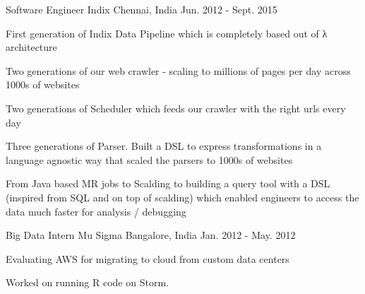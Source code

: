 \begin{cventries}
  \cventry
    {Software Engineer} %
    {Indix} %
    {Chennai, India} %
    {Jun. 2012 - Sept. 2015} %
    {
      \begin{cvitems} %
        \item {First generation of Indix Data Pipeline which is completely based out of λ architecture }
        \item {Two generations of our web crawler - scaling to millions of pages per day across 1000s of websites }
        \item {Two generations of Scheduler which feeds our crawler with the right urls every day }
        \item {Three generations of Parser. Built a DSL to express transformations in a language agnostic way that scaled the parsers to 1000s of websites }
        \item {From Java based MR jobs to Scalding to building a query tool with a DSL (inspired from SQL and on top of scalding) which enabled engineers to access the data much faster for analysis / debugging }
      \end{cvitems}
    }

  \cventry
    {Big Data Intern} %
    {Mu Sigma} %
    {Bangalore, India} %
    {Jan. 2012 - May. 2012} %
    {
      \begin{cvitems} %
        \item {Evaluating AWS for migrating to cloud from custom data centers}
        \item {Worked on running R code on Storm.}
      \end{cvitems}
    }

\end{cventries}
